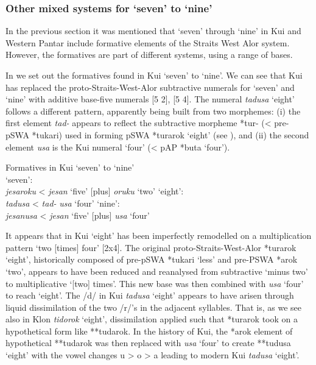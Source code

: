 \subsubsection{Other mixed systems for `seven' to `nine'}\label{sec:6:5.2.3}
In the previous section it was mentioned that `seven' through `nine' in Kui and Western Pantar include formative elements of the Straits West Alor system. However, the formatives are part of different systems, using a range of bases.

In  we set out the formatives found in Kui `seven' to `nine'. We can see that Kui has replaced the proto-Straits-West-Alor subtractive numerals for `seven' and `nine' with additive base-five numerals [5 2], [5 4]. The numeral \textit{tadusa} `eight' follows a different pattern, apparently being built from two morphemes: (i) the first element \textit{tad-} appears to reflect the subtractive morpheme *tur- ({\textless} pre-pSWA *tukari) used in forming pSWA *turarok `eight' (see ), and (ii) the second element \textit{usa} is the Kui numeral `four' ({\textless} pAP *buta `four'). 

 

\ea%
\label{ex:6:10}
 Formatives in Kui `seven' to `nine'\\
\ea `seven': \\
\textit{j}\textit{esaroku}  {\textless}  \textit{jesan} `five'   [plus]  \textit{oruku} `two'
\ex `eight':\\
\textit{tadusa}    {\textless}  \textit{tad-}      \textit{usa} `four'
\ex `nine':\\
\textit{je}\textit{sanusa}  {\textless}    \textit{jesan} `five'  [plus]  \textit{usa} `four'
\z
\z

It appears that in Kui `eight' has been imperfectly remodelled on a multiplication pattern `two [times] four' [2x4]. The original proto-Straits-West-Alor *turarok `eight', historically composed of pre-pSWA *tukari `less' and pre-PSWA *arok `two', appears to have been reduced and reanalysed from subtractive `minus two' to multiplicative `[two] times'. This new base was then combined with \textit{usa} `four' to reach `eight'. The /d/ in Kui \textit{tadusa} `eight' appears to have arisen through liquid dissimilation of the two /r/'s in the adjacent syllables. That is, as we see also in Klon \textit{tidorok} `eight', dissimilation applied such that *turarok took on a hypothetical form like **tudarok. In the history of Kui, the *arok element of hypothetical **tudarok was then replaced with \textit{usa} `four' to create **tudusa `eight' with the vowel changes u {\textgreater} o {\textgreater} a leading to modern Kui \textit{tadusa} `eight'.

